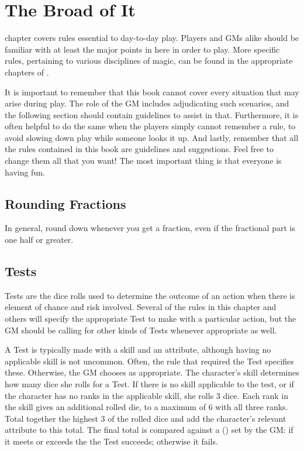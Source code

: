 \chapter{The Broad of It}

 chapter covers rules essential to day-to-day play.
Players and GMs alike should be familiar with at least the major points in here in order to play.
More specific rules, pertaining to various disciplines of magic, can be found in the appropriate chapters of .

It is important to remember that this book cannot cover every situation that may arise during play.
The role of the GM includes adjudicating such scenarios, and the following section should contain guidelines to assist in that.
Furthermore, it is often helpful to do the same when the players simply cannot remember a rule, to avoid slowing down play while someone looks it up.
And lastly, remember that all the rules contained in this book are guidelines and suggestions.
Feel free to change them all that you want!
The most important thing is that everyone is having fun.

\section{Rounding Fractions}

In general, round down whenever you get a fraction, even if the fractional part is one half or greater.

\section{Tests}

Tests are the dice rolls used to determine the outcome of an action when there is element of chance and risk involved.
Several of the rules in this chapter and others will specify the appropriate Test to make with a particular action, but the GM should be calling for other kinds of Tests whenever appropriate as well.

A Test is typically made with a skill and an attribute, although having no applicable skill is not uncommon.
Often, the rule that required the Test specifies these.
Otherwise, the GM chooses as appropriate.
The character's skill determines how many dice she rolls for a Test.
If there is no skill applicable to the test, or if the character has no ranks in the applicable skill, she rolls 3 dice.
Each rank in the skill gives an additional rolled die, to a maximum of 6 with all three ranks.
Total together the highest 3 of the rolled dice and add the character's relevant attribute to this total.
The final total is compared against a {\targetnumber} ({\tn}) set by the GM: if it meets or exceeds the {\tn} the Test succeeds; otherwise it fails.

